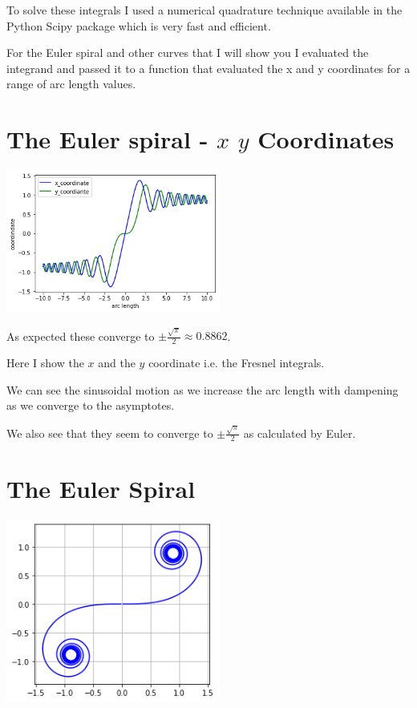 \documentclass[]{article} %
\theoremstyle{definition}
\theoremstyle{theorem}
\begin{document}
To solve these integrals I used a numerical quadrature technique available in the Python Scipy package which is very fast and efficient. 

For the Euler spiral and other curves that I will show you I evaluated the integrand and passed it to a function that evaluated the x and y coordinates for a range of arc length values.

\section{The Euler spiral - $x$ $y$ Coordinates}
\begin{tcolorbox}
	\begin{minipage}{\linewidth}
		\centering
		\includegraphics[width=70mm, scale=0.5]{euler_x_vs_y.png}
	\end{minipage}
	As expected these converge to $\pm \frac{\sqrt{\pi}}{2} \approx 0.8862$.
\end{tcolorbox}

Here I show the $x$ and the $y$ coordinate i.e. the Fresnel integrals.

We can see the sinusoidal motion as we increase the arc length with dampening as we converge to the asymptotes. 

We also see that they seem to converge to $\pm \frac{\sqrt{\pi}}{2}$ as calculated by Euler. 

\section{The Euler Spiral}
\begin{tcolorbox}
	\begin{minipage}{\linewidth}
		\centering
		\includegraphics[width=70mm, scale=0.5]{euler_spiral.png}
	\end{minipage}
\end{tcolorbox}
\end{document}
